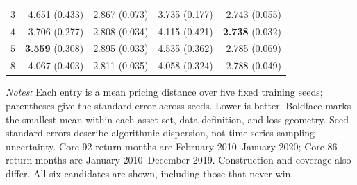\begin{widetable}[!tbp]
\begin{minipage}{\textwidth}
\begin{tabular*}{\linewidth}{@{\extracolsep{\fill}}crrrr@{}}
$3$ & 4.651 (0.433) & 2.867 (0.073) & 3.735 (0.177) & 2.743 (0.055) \\
$4$ & 3.706 (0.277) & 2.808 (0.034) & 4.115 (0.421) & \textbf{2.738} (0.032) \\
$5$ & \textbf{3.559} (0.308) & 2.895 (0.033) & 4.535 (0.362) & 2.785 (0.069) \\
$8$ & 4.067 (0.403) & 2.811 (0.035) & 4.058 (0.324) & 2.788 (0.049) \\
\bottomrule
\end{tabular*}
\par\vspace{4pt}
{\footnotesize\raggedright\textit{Notes:} Each entry is a mean pricing distance over five fixed training seeds; parentheses give the standard error across seeds. Lower is better. Boldface marks the smallest mean within each asset set, data definition, and loss geometry. Seed standard errors describe algorithmic dispersion, not time-series sampling uncertainty. Core-92 return months are February 2010--January 2020; Core-86 return months are January 2010--December 2019. Construction and coverage also differ. All six candidates are shown, including those that never win.\par}
\end{minipage}
\end{widetable}
